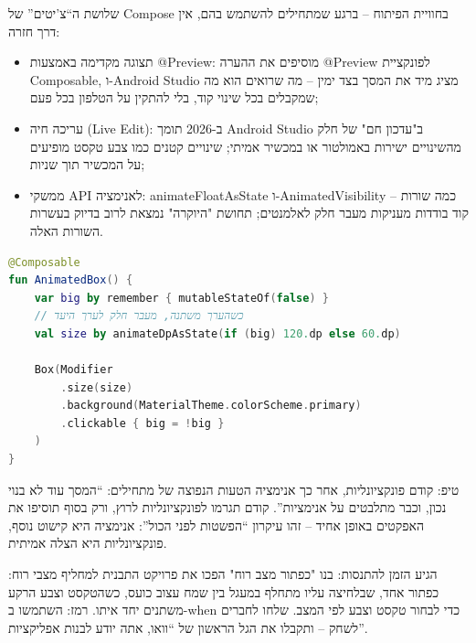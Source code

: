 
שלושת ה“צ'יטים” של Compose בחוויית הפיתוח – ברגע שמתחילים להשתמש בהם, אין דרך חזרה:

\begin{itemize}
  \item תצוגה מקדימה באמצעות @Preview: מוסיפים את ההערה @Preview לפונקציית Composable, ו-Android Studio מציג מיד את המסך בצד ימין – מה שרואים הוא מה שמקבלים בכל שינוי קוד, בלי להתקין על הטלפון בכל פעם;
  \item עריכה חיה (Live Edit): ב-2026 תומך Android Studio ב"עדכון חם" של חלק מהשינויים ישירות באמולטור או במכשיר אמיתי; שינויים קטנים כמו צבע טקסט מופיעים על המכשיר תוך שניות;
  \item ממשקי API לאנימציה: animateFloatAsState ו-AnimatedVisibility – כמה שורות קוד בודדות מעניקות מעבר חלק לאלמנטים; תחושת "היוקרה" נמצאת לרוב בדיוק בעשרות השורות האלה.
\end{itemize}

\begin{lstlisting}[language=Kotlin]
@Composable
fun AnimatedBox() {
    var big by remember { mutableStateOf(false) }
    // כשהערך משתנה, מעבר חלק לערך היעד
    val size by animateDpAsState(if (big) 120.dp else 60.dp)

    Box(Modifier
        .size(size)
        .background(MaterialTheme.colorScheme.primary)
        .clickable { big = !big }
    )
}
\end{lstlisting}

\begin{tcbinfo}{טיפ: קודם פונקציונליות, אחר כך אנימציה}
הטעות הנפוצה של מתחילים: “המסך עוד לא בנוי נכון, וכבר מתלבטים על אנימציות”. קודם תגרמו לפונקציונליות לרוץ, ורק בסוף תוסיפו את האפקטים באופן אחיד – זהו עיקרון “הפשטות לפני הכול”: אנימציה היא קישוט נוסף, פונקציונליות היא הצלה אמיתית.

\end{tcbinfo}

\begin{tcbpractice}{הגיע הזמן להתנסות: בנו "כפתור מצב רוח"}
הפכו את פרויקט התבנית למחליף מצבי רוח: כפתור אחד, שבלחיצה עליו מתחלף במעגל בין שמח עצוב כועס, כשהטקסט וצבע הרקע משתנים יחד איתו. רמז: השתמשו ב-when כדי לבחור טקסט וצבע לפי המצב. שלחו לחברים לשחק – ותקבלו את הגל הראשון של “וואו, אתה יודע לבנות אפליקציות”.

\end{tcbpractice}

